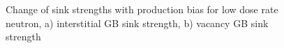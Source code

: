\documentclass[a4paper]{article}
\begin{document}
\begin{figure}[h!]
        \qquad
        \caption{Change of sink strengths with production bias for low dose rate neutron, a) interstitial GB sink strength, b) vacancy GB sink strength}
        \label{figure:sink_strengths_neutron_bias_Z}
      \end{figure}
\end{document}
